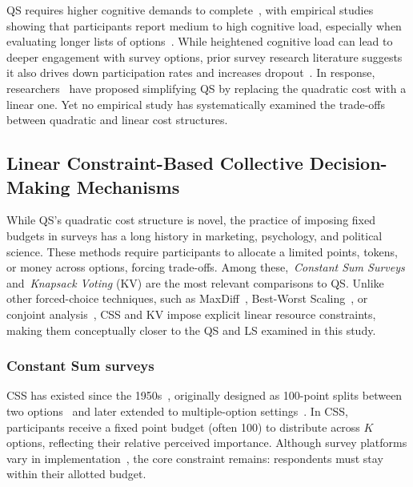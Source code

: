 QS requires higher cognitive demands to complete~\cite{chengOrganizeThenVote2025}, with empirical studies showing that participants report medium to high cognitive load, especially when evaluating longer lists of options~\cite{cavaille2024cares}. While heightened cognitive load can lead to deeper engagement with survey options, prior survey research literature suggests it also drives down participation rates and increases dropout~\cite{brosnanCognitiveLoadReduction2021, galesicDropoutsWebEffects2006}. In response, researchers~\cite{cavaille2024cares} have proposed simplifying QS by replacing the quadratic cost with a linear one. Yet no empirical study has systematically examined the trade-offs between quadratic and linear cost structures.

\subsection{Linear Constraint-Based Collective Decision-Making Mechanisms}
\label{sec:related_works_force_choice}
While QS's quadratic cost structure is novel, the practice of imposing fixed budgets in surveys has a long history in marketing, psychology, and political science. These methods require participants to allocate a limited points, tokens, or money across options, forcing trade-offs. Among these,~\textit{Constant Sum Surveys} and~\textit{Knapsack Voting} (KV) are the most relevant comparisons to QS. Unlike other forced-choice techniques, such as MaxDiff~\cite{tsafarakisInvestigatingPreferencesIndividuals2019, schrammIncentiveAlignmentAnchored2024}, Best-Worst Scaling~\cite{louviereBestWorstScalingTheory2015}, or conjoint analysis~\cite{bagozziAdvancedMarketingResearch1994}, CSS and KV impose explicit linear resource constraints, making them conceptually closer to the QS and LS examined in this study.

\subsubsection{Constant Sum surveys}
CSS has existed since the 1950s~\cite{Malhotra_Naresh_K_2012, smithBasicMarketingResearch2013, Donald_R_Cooper2013-03-05}, originally designed as 100-point splits between two options~\cite{metfesselProposalQuantitativeReporting1947} and later extended to multiple-option settings~\cite{zhuSelfestimationWeightParameter1991, harwoodUnderstandingImplicitExplicit2019}. In CSS, participants receive a fixed point budget (often 100) to distribute across $K$ options, reflecting their relative perceived importance. Although survey platforms vary in implementation~\cite{qualtricsConstantSumQuestion2025, surveysparrowWhatConstantSum2025, lorraineConstantSumQuestion2022}, the core constraint remains: respondents must stay within their allotted budget.

